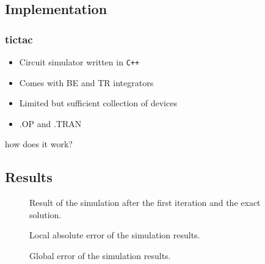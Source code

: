 \subsection{Implementation}

\begin{frame}
\frametitle{tictac}
\begin{itemize}[<+->]
    \item Circuit simulator written in \texttt{C++}
    \item Comes with BE and TR integrators
    \item Limited but sufficient collection of devices
    \item .OP and .TRAN
\end{itemize}
\end{frame}

\begin{frame}
how does it work?
\end{frame}

\subsection{Results}

\begin{frame}
    \begin{figure}[ht]
        \centering
        \scalebox{0.8}{}
        \caption{Result of the simulation after the first iteration and the exact solution.}
        \label{fig:iters_log}
    \end{figure}
\end{frame}

\begin{frame}
    \begin{figure}[ht]
        \centering
        \scalebox{0.8}{}
        \caption{Local absolute error of the simulation results.}
        \label{fig:iters_log}
    \end{figure}
\end{frame}

\begin{frame}
    \begin{figure}[ht]
        \centering
        \scalebox{0.8}{}
        \caption{Global error of the simulation results.}
        \label{fig:iters_log}
    \end{figure}
\end{frame}